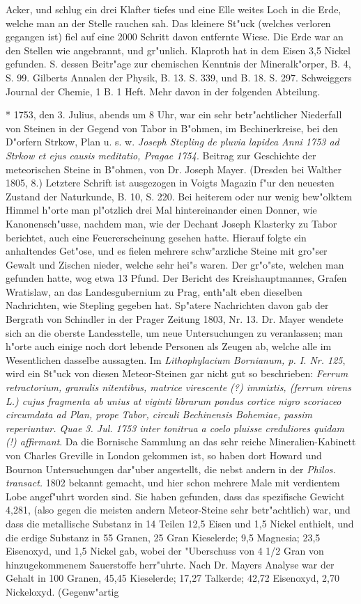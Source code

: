 \documentclass[a4paper, 11pt, oneside, polutonikogreek, german]{article}
\begin{document}
Acker, und schlug ein drei Klafter tiefes und eine Elle weites Loch in die Erde, welche man an der Stelle rauchen sah. Das kleinere St"uck (welches verloren gegangen ist) fiel auf eine 2000 Schritt davon entfernte Wiese. Die Erde war an den Stellen wie angebrannt, und gr"unlich. Klaproth hat in dem Eisen 3,5 Nickel gefunden. S. dessen Beitr"age zur chemischen Kenntnis der Mineralk"orper, B. 4, S. 99. Gilberts Annalen der Physik, B. 13. S. 339, und B. 18. S. 297. Schweiggers Journal der Chemie, 1 B. 1 Heft. Mehr davon in der folgenden Abteilung.

* 1753, den 3. Julius, abends um 8 Uhr, war ein sehr betr"achtlicher Niederfall von Steinen in der Gegend von Tabor in B"ohmen, im Bechinerkreise, bei den D"orfern Strkow, Plan u. s. w. \emph{Joseph Stepling de pluvia lapidea Anni 1753 ad Strkow et ejus causis meditatio, Pragae 1754}. Beitrag zur Geschichte der meteorischen Steine in B"ohmen, von Dr. Joseph Mayer. (Dresden bei Walther 1805, 8.) Letztere Schrift ist ausgezogen in Voigts Magazin f"ur den neuesten Zustand der Naturkunde, B. 10, S. 220. Bei heiterem oder nur wenig bew"olktem Himmel h"orte man pl"otzlich drei Mal hintereinander einen Donner, wie Kanonensch"usse, nachdem man, wie der Dechant Joseph Klasterky zu Tabor berichtet, auch eine Feuererscheinung gesehen hatte. Hierauf folgte ein anhaltendes Get"ose, und es fielen mehrere schw"arzliche Steine mit gro"ser Gewalt und Zischen nieder, welche sehr hei"s waren. Der gr"o"ste, welchen man gefunden hatte, wog etwa 13 Pfund. Der Bericht des Kreishauptmannes, Grafen Wratislaw, an das Landesgubernium zu Prag, enth"alt eben dieselben Nachrichten, wie Stepling gegeben hat. Sp"atere Nachrichten davon gab der Bergrath von Schindler in der Prager Zeitung 1803, Nr. 13. Dr. Mayer wendete sich an die oberste Landesstelle, um neue Untersuchungen zu veranlassen; man h"orte auch einige noch dort lebende Personen als Zeugen ab, welche alle im Wesentlichen dasselbe aussagten. Im \emph{Lithophylacium Bornianum, p. I. Nr. 125}, wird ein St"uck von diesen Meteor-Steinen gar nicht gut so beschrieben: \emph{Ferrum retractorium, granulis nitentibus, matrice virescente (?) immixtis, (ferrum virens L.) cujus fragmenta ab unius at viginti librarum pondus cortice nigro scoriaceo circumdata ad Plan, prope Tabor, circuli Bechinensis Bohemiae, passim reperiuntur. Quae 3. Jul. 1753 inter tonitrua a coelo pluisse creduliores quidam (!) affirmant}. Da die Bornische Sammlung an das sehr reiche Mineralien-Kabinett von Charles Greville in London gekommen ist, so haben dort Howard und Bournon Untersuchungen dar"uber angestellt, die nebst andern in der \emph{Philos. transact.} 1802 bekannt gemacht, und hier schon mehrere Male mit verdientem Lobe angef"uhrt worden sind. Sie haben gefunden, dass das spezifische Gewicht 4,281, (also gegen die meisten andern Meteor-Steine sehr betr"achtlich) war, und dass die metallische Substanz in 14 Teilen 12,5 Eisen und 1,5 Nickel enthielt, und die erdige Substanz in 55 Granen, 25 Gran Kieselerde; 9,5 Magnesia; 23,5 Eisenoxyd, und 1,5 Nickel gab, wobei der "Uberschuss von 4 1/2 Gran von hinzugekommenem Sauerstoffe herr"uhrte. Nach Dr. Mayers Analyse war der Gehalt in 100 Granen, 45,45 Kieselerde; 17,27 Talkerde; 42,72 Eisenoxyd, 2,70 Nickeloxyd. (Gegenw"artig 
\end{document}
